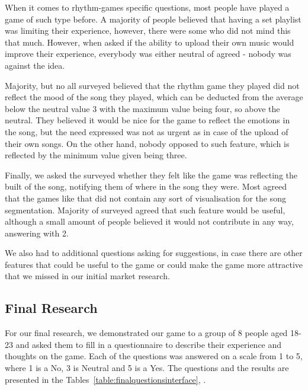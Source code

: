When it comes to rhythm-games specific questions, most people have played a game of such type before. A majority of people believed that having a set playlist was limiting their experience, however, there were some who did not mind this that much. However, when asked if the ability to upload their own music would improve their experience, everybody was either neutral of agreed - nobody was against the idea. 

Majority, but no all surveyed believed that the rhythm game they played did not reflect the mood of the song they played, which can be deducted from the average below the neutral value 3 with the maximum value being four, so above the neutral. They believed it would be nice for the game to reflect the emotions in the song, but the need expressed was not as urgent as in case of the upload of their own songs. On the other hand, nobody opposed to such feature, which is reflected by the minimum value given being three.

Finally, we asked the surveyed whether they felt like the game was reflecting the built of the song, notifying them of where in the song they were. Most agreed that the games like that did not contain any sort of visualisation for the song segmentation. Majority of surveyed agreed that such feature would be useful, although a small amount of people believed it would not contribute in any way, answering with 2.

We also had to additional questions asking for suggestions, in case there are other features that could be useful to the game or could make the game more attractive that we missed in our initial market research. 

\subsection*{Final Research}

For our final research, we demonstrated our game to a group of 8 people aged 18-23 and asked them to fill in a questionnaire to describe their experience and thoughts on the game. Each of the questions was answered on a scale from 1 to 5, where 1 is a No,  3 is Neutral and 5 is a Yes. The questions and the results are presented in the Tables~\ref{table:finalquestionsinterface}, .


